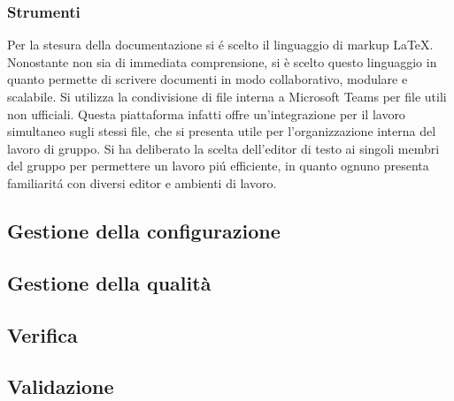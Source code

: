   \subsubsection{Strumenti}
    \subsubsubsection{\LaTeX}
    Per la stesura della documentazione si é scelto il linguaggio di markup \LaTeX. Nonostante non sia di immediata comprensione, si è scelto questo linguaggio in quanto permette di scrivere documenti in modo collaborativo, modulare e scalabile.
    Si utilizza la condivisione di file interna a Microsoft Teams per file utili non ufficiali. Questa piattaforma infatti offre un'integrazione per il lavoro simultaneo sugli stessi file, che si presenta utile per l'organizzazione interna del lavoro di gruppo.
    Si ha deliberato la scelta dell'editor di testo ai singoli membri del gruppo per permettere un lavoro piú efficiente, in quanto ognuno presenta familiaritá con diversi editor e ambienti di lavoro.



  \subsection{Gestione della configurazione}
  \subsection{Gestione della qualità}
  \subsection{Verifica}
  \subsection{Validazione}

